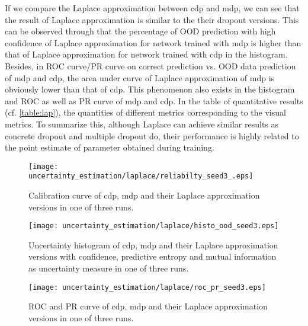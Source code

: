 If we compare the Laplace approximation between cdp and mdp, we can see that the result of Laplace approximation is similar to the their dropout versions. This can be observed through that the percentage of OOD prediction with high confidence of Laplace approximation for network trained with mdp is higher than that of Laplace approximation for network trained with cdp in the histogram. Besides, in ROC curve/PR curve on correct prediction vs. OOD data prediction of mdp and cdp, the area under curve of Laplace approximation of mdp is obviously lower than that of cdp. This phenomenon also exists in the histogram and ROC as well as PR curve of mdp and cdp. In the table of quantitative results (cf. \ref{table:lap}), the quantities of different metrics corresponding to the visual metrics. To summarize this, although Laplace can achieve similar results as concrete dropout and multiple dropout do, their performance is highly related to the point estimate of parameter obtained during training.

\begin{figure}[H]
	\begin{center}
		\texttt{[image: uncertainty\_estimation/laplace/reliabilty\_seed3\_.eps]}
		\caption{Calibration curve of cdp, mdp and their Laplace approximation versions in one of three runs.}		
		\label{lap_calibration}
	\end{center}
\end{figure}

\begin{figure}[H]		
	\centering
	\texttt{[image: uncertainty\_estimation/laplace/histo\_ood\_seed3.eps]}
	\caption{Uncertainty histogram of cdp, mdp and their Laplace approximation versions with confidence, predictive entropy and mutual information as uncertainty measure in one of three runs.}
	\label{figure:lap_hist}	
\end{figure}


\begin{figure}[H]
	\begin{center}
		\texttt{[image: uncertainty\_estimation/laplace/roc\_pr\_seed3.eps]}
		\caption{ROC and PR curve of cdp, mdp and their Laplace approximation versions in one of three runs.}		
		\label{lap_roc_pr}
	\end{center}
\end{figure}

